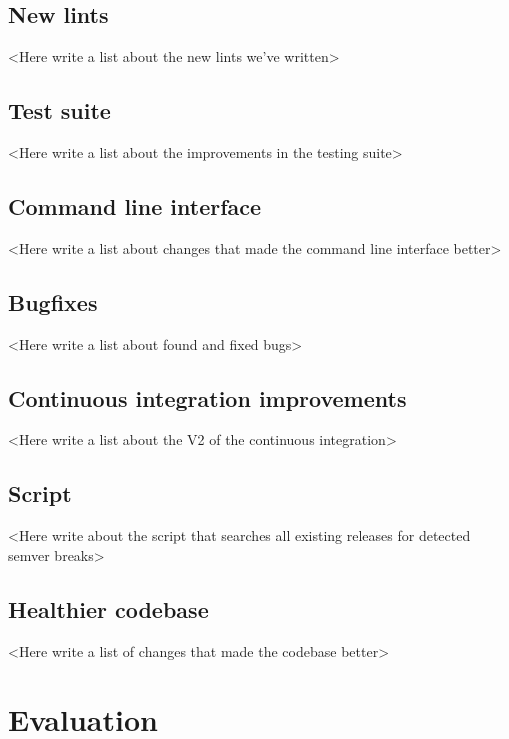 \documentclass[licencjacka,en]{pracamgr}
\begin{document}
\section{New lints}\label{r:section_new_lints}

<Here write a list about the new lints we've written>

\section{Test suite}

<Here write a list about the improvements in the testing suite>

\section{Command line interface}

<Here write a list about changes that made the command line interface better>

\section{Bugfixes}

<Here write a list about found and fixed bugs>

\section{Continuous integration improvements}\label{r:section_continuous_integration_improvements}

<Here write a list about the V2 of the continuous integration>

\section{Script}

<Here write about the script that searches all existing releases for detected semver breaks>

\section{Healthier codebase}

<Here write a list of changes that made the codebase better>

\chapter{Evaluation}\label{r:chapter_evaluation}
\end{document}
